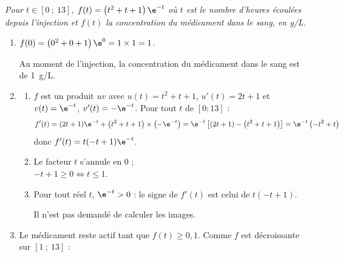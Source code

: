 \emph{Pour $t \in [0~;~13]$, $f(t) = \left(t^2 + t + 1\right)\e^{-t}$ où $t$ est le nombre
d'heures écoulées depuis l'injection et $f(t)$ la concentration du médicament dans le sang,
en g/L.}

\begin{enumerate}
	\item $f(0) = \left(0^2 + 0 + 1\right)\e^{0} = 1 \times 1 = 1$.

	Au moment de l'injection, la concentration du médicament dans le sang est de
	1~g/L.

	\item
	\begin{enumerate}
		\item $f$ est un produit $uv$ avec $u(t) = t^2 + t + 1$, $u'(t) = 2t + 1$ et
		$v(t) = \e^{-t}$, $v'(t) = -\e^{-t}$. Pour tout $t$ de $[0 ; 13]$ :
		\[f'(t) = (2t + 1)\e^{-t} + \left(t^2 + t + 1\right)\times\left(-\e^{-t}\right)
		= \e^{-t}\left[(2t + 1) - \left(t^2 + t + 1\right)\right]
		= \e^{-t}\left(-t^2 + t\right)\]
		donc $f'(t) = t(-t + 1)\e^{-t}$.

		\item Le facteur $t$ s'annule en 0 ;\\

		 $-t + 1 \geqslant 0 \iff t \leqslant 1$.

		\begin{center}
		\end{center}

		\item Pour tout réel $t$, $\e^{-t} > 0$ : le signe de $f'(t)$ est celui de
		$t(-t + 1)$.

		\begin{center}
		\end{center}

Il n'est pas demandé de calculer les images.
	\end{enumerate}

	\item Le médicament reste actif tant que $f(t) \geqslant 0,1$. Comme $f$ est décroissante sur $[1~;~13]$ :


\end{enumerate}

